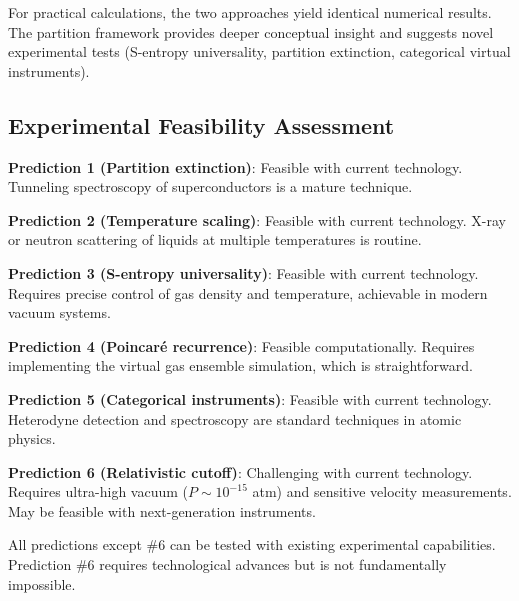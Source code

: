 For practical calculations, the two approaches yield identical numerical results. The partition framework provides deeper conceptual insight and suggests novel experimental tests (S-entropy universality, partition extinction, categorical virtual instruments).

\subsection{Experimental Feasibility Assessment}

\textbf{Prediction 1 (Partition extinction)}: Feasible with current technology. Tunneling spectroscopy of superconductors is a mature technique.

\textbf{Prediction 2 (Temperature scaling)}: Feasible with current technology. X-ray or neutron scattering of liquids at multiple temperatures is routine.

\textbf{Prediction 3 (S-entropy universality)}: Feasible with current technology. Requires precise control of gas density and temperature, achievable in modern vacuum systems.

\textbf{Prediction 4 (Poincaré recurrence)}: Feasible computationally. Requires implementing the virtual gas ensemble simulation, which is straightforward.

\textbf{Prediction 5 (Categorical instruments)}: Feasible with current technology. Heterodyne detection and spectroscopy are standard techniques in atomic physics.

\textbf{Prediction 6 (Relativistic cutoff)}: Challenging with current technology. Requires ultra-high vacuum ($P \sim 10^{-15}$ atm) and sensitive velocity measurements. May be feasible with next-generation instruments.

All predictions except \#6 can be tested with existing experimental capabilities. Prediction \#6 requires technological advances but is not fundamentally impossible.


